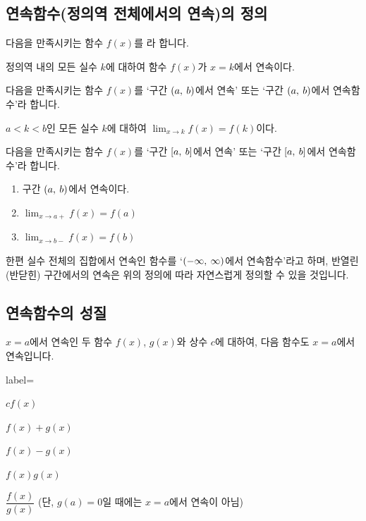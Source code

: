 \subsection{연속함수(정의역 전체에서의 연속)의 정의}
다음을 만족시키는 함수 $f(x)$를 라 합니다.
\begin{justbox}
정의역 내의 모든 실수 $k$에 대하여 함수 $f\left( x \right) $가 $x=k$에서 연속이다.
\end{justbox}
다음을 만족시키는 함수 $f(x)$를 `구간 $\left(a,\: b\right)$에서 연속' 또는 `구간 $\left(a,\: b\right)$에서 연속함수'라 합니다.
\begin{justbox}
$a<k<b$인 모든 실수 $k$에 대하여 $\lim_{x \to k} f\left( x \right) = f\left( k \right) $이다.
\end{justbox}
다음을 만족시키는 함수 $f(x)$를 `구간 $\left[a,\: b\right]$에서 연속' 또는 `구간 $\left[a,\: b\right]$에서 연속함수'라 합니다.
\begin{justbox}
\begin{enumerate}[label={\onum*}]
    \item  구간 $\left(a,\: b\right)$에서 연속이다.
    \item $\lim_{x \to a+} f(x)= f\left( a \right) $
    \item $\lim_{x \to b-} f(x)= f\left( b \right) $    
\end{enumerate}
\end{justbox}
한편 실수 전체의 집합에서 연속인 함수를 `$\left(-\infty,\: \infty\right)$에서 연속함수'라고 하며, 반열린(반닫힌) 구간에서의 연속은 위의 정의에 따라 자연스럽게 정의할 수 있을 것입니다.
\clearpage
\subsection{연속함수의 성질}
$x=a$에서 연속인 두 함수 $f\left( x \right) $, $g\left( x \right) $와 상수 $c$에 대하여, 다음 함수도 $x=a$에서 연속입니다.
\begin{selection}{label={\onum* }}
    \item $cf\left( x \right) $
    \item $f\left( x \right) + g\left( x \right)  $
    \item $f\left( x \right) - g\left( x \right) $
    \item $f\left( x \right)g\left( x \right)  $
    \item $\dfrac{f\left( x \right)}{g\left( x \right)} $  (단, $g\left( a \right)  = 0$일 때에는 $x=a$에서 연속이 아님)
\end{selection}

